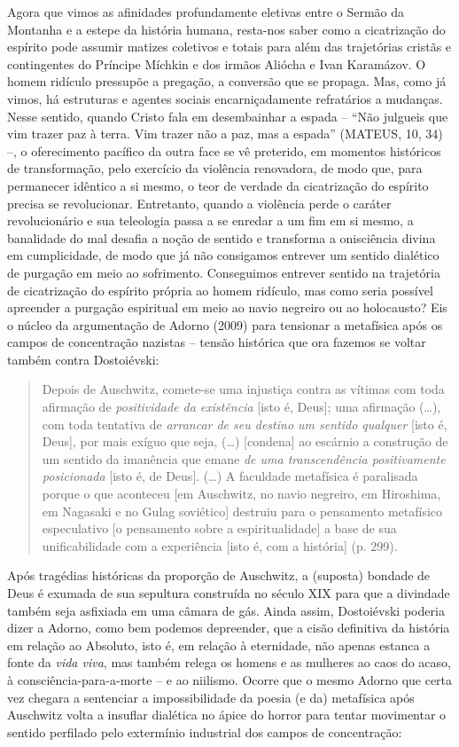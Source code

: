 Agora que vimos as afinidades profundamente eletivas entre o Sermão da
Montanha e a estepe da história humana, resta-nos saber como a
cicatrização do espírito pode assumir matizes coletivos e totais para
além das trajetórias cristãs e contingentes do Príncipe Míchkin e dos
irmãos Aliócha e Ivan Karamázov. O homem ridículo pressupõe a pregação,
a conversão que se propaga. Mas, como já vimos, há estruturas e agentes
sociais encarniçadamente refratários a mudanças. Nesse sentido, quando
Cristo fala em desembainhar a espada -- ``Não julgueis que vim trazer
paz à terra. Vim trazer não a paz, mas a espada'' (MATEUS, 10, 34) --, o
oferecimento pacífico da outra face se vê preterido, em momentos
históricos de transformação, pelo exercício da violência renovadora, de
modo que, para permanecer idêntico a si mesmo, o teor de verdade da
cicatrização do espírito precisa se revolucionar. Entretanto, quando a
violência perde o caráter revolucionário e sua teleologia passa a se
enredar a um fim em si mesmo, a banalidade do mal desafia a noção de
sentido e transforma a onisciência divina em cumplicidade, de modo que
já não consigamos entrever um sentido dialético de purgação em meio ao
sofrimento. Conseguimos entrever sentido na trajetória de cicatrização
do espírito própria ao homem ridículo, mas como seria possível apreender
a purgação espiritual em meio ao navio negreiro ou ao holocausto? Eis o
núcleo da argumentação de Adorno (2009) para tensionar a metafísica após
os campos de concentração nazistas -- tensão histórica que ora fazemos
se voltar também contra Dostoiévski:

\begin{quote}
Depois de Auschwitz, comete-se uma injustiça contra as vítimas com toda
afirmação de \emph{positividade da existência} {[}isto é, Deus{]}; uma
afirmação (\ldots{}), com toda tentativa de \emph{arrancar de seu
destino um sentido qualquer} {[}isto é, Deus{]}, por mais exíguo que
seja, (\ldots{}) {[}condena{]} ao escárnio a construção de um sentido da
imanência que emane \emph{de uma transcendência positivamente
posicionada} {[}isto é, de Deus{]}. (\ldots{}) A faculdade metafísica é
paralisada porque o que aconteceu {[}em Auschwitz, no navio negreiro, em
Hiroshima, em Nagasaki e no Gulag soviético{]} destruiu para o
pensamento metafísico especulativo {[}o pensamento sobre a
espiritualidade{]} a base de sua unificabilidade com a experiência
{[}isto é, com a história{]} (p. 299).
\end{quote}

Após tragédias históricas da proporção de Auschwitz, a (suposta) bondade
de Deus é exumada de sua sepultura construída no século XIX para que a
divindade também seja asfixiada em uma câmara de gás. Ainda assim,
Dostoiévski poderia dizer a Adorno, como bem podemos depreender, que a
cisão definitiva da história em relação ao Absoluto, isto é, em relação
à eternidade, não apenas estanca a fonte da \emph{vida viva}, mas também
relega os homens e as mulheres ao caos do acaso, à
consciência-para-a-morte -- e ao niilismo. Ocorre que o mesmo Adorno que
certa vez chegara a sentenciar a impossibilidade da poesia (e da)
metafísica após Auschwitz volta a insuflar dialética no ápice do horror
para tentar movimentar o sentido perfilado pelo extermínio industrial
dos campos de concentração:

